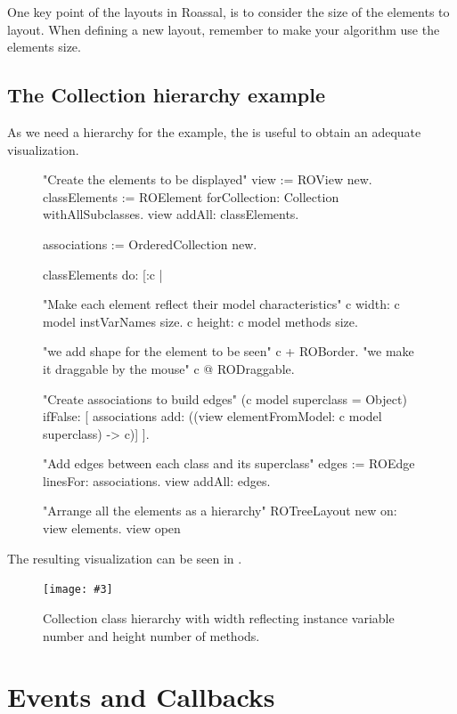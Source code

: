\documentclass[a4paper,10pt,twoside]{book}
\newcommand{\fig}[4]{
		\begin{figure}[#1]
			\centering
			\texttt{[image: \#3]}
			\caption{\label{fig:#3}#4}
		\end{figure}}
\begin{document}
One key point of the layouts in Roassal, is to consider the size of the elements to layout. When defining a new layout, remember to make your algorithm use the elements size.

\subsection*{The Collection hierarchy example}

As we need a hierarchy for the  example, the  is useful to obtain an adequate visualization.

\begin{figure}[H]
\begin{code}{}

"Create the elements to be displayed"
view := ROView new.
classElements := ROElement forCollection: Collection withAllSubclasses.
view addAll: classElements.

associations := OrderedCollection new.

classElements do: [:c | 

	"Make each element reflect their model characteristics"
	c width: c model instVarNames size.
	c height: c model methods size.
	
	"we add shape for the element to be seen"
	c + ROBorder. 
	"we make it draggable by the mouse"
	c @ RODraggable.
	
	"Create associations to build edges"
	(c model superclass = Object)
		ifFalse: [ associations add: ((view elementFromModel: c model superclass) -> c)]	
	 ].
	 
"Add edges between each class and its superclass"
edges := ROEdge linesFor: associations.
view addAll: edges.

"Arrange all the elements as a hierarchy"
ROTreeLayout new on: view elements.
view open
\end{code}
\end{figure}

The resulting visualization can be seen in .

\fig{H}{0.4}{collectionHierarchy}{Collection class hierarchy with width reflecting instance variable number and height number of methods.}


\section{Events and Callbacks}
\end{document}
